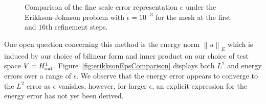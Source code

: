 \documentclass[final,leqno]{siamltex}
\newcommand{\nor}[1]{\left\| #1 \right\|}
\begin{document}
\begin{figure}[!h]
\centering
{}
\caption{Comparison of the fine scale error representation $e$ under the Erikkson-Johnson problem with $\epsilon = 10^{-3}$ for the mesh at the first and $16$th refinement steps.}
\label{fig:erikksonError}
\end{figure}

One open question concerning this method is the energy norm $\nor{u}_E$ which is induced by our choice of bilinear form and inner product on our choice of test space $V = H^1_{\rm out}$.  Figure~\ref{fig:erikksonEpsComparison} displays both $L^2$ and energy errors over a range of $\epsilon$.  We observe that the energy error appears to converge to the $L^2$ error as $\epsilon$ vanishes, however, for larger $\epsilon$, an explicit expression for the energy error has not yet been derived.  
\end{document}
